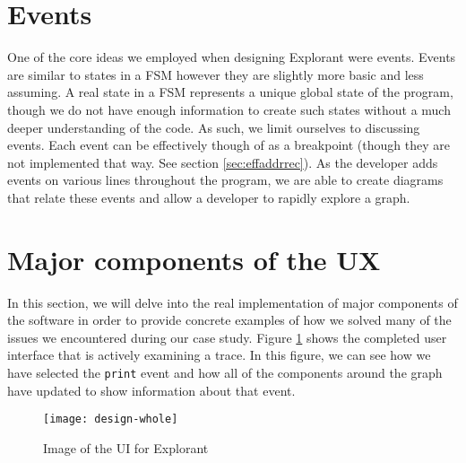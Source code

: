 \section{Events}
One of the core ideas we employed when designing Explorant were events. Events are similar to states in a FSM however they are slightly more basic and less assuming. A real state in a FSM represents a unique global state of the program, though we do not have enough information to create such states without a much deeper understanding of the code. As such, we limit ourselves to discussing events. Each event can be effectively though of as a breakpoint (though they are not implemented that way. See section \ref{sec:effaddrrec}). As the developer adds events on various lines throughout the program, we are able to create diagrams that relate these events and allow a developer to rapidly explore a graph.

\section{Major components of the UX}
In this section, we will delve into the real implementation of major components of the software in order to provide concrete examples of how we solved many of the issues we encountered during our case study. Figure \ref{fig:graph-whole} shows the completed user interface that is actively examining a trace. In this figure, we can see how we have selected the \texttt{print} event and how all of the components around the graph have updated to show information about that event. 

\begin{figure}[!ht]
    \centering
    \texttt{[image: design-whole]}
    \caption{Image of the UI for Explorant}
    \label{fig:graph-whole}
\end{figure}

